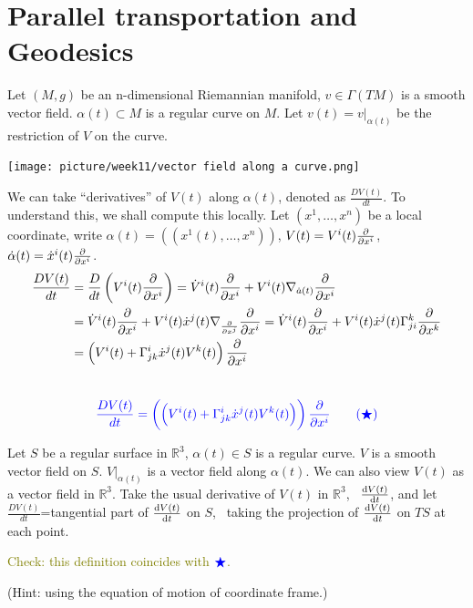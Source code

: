 \section{Parallel transportation and Geodesics}
Let \((M,g)\) be an n-dimensional Riemannian manifold, \(v\in 
\Gamma(TM)\) is a smooth vector field. \(\alpha(t)\subset M\) is a 
regular curve on \(M\). Let \(v(t)=v|_{\alpha(t)}\) be the restriction of 
\(V\) on the curve.
\begin{center}
    \texttt{[image: picture/week11/vector field 
    along a curve.png]}
\end{center}
We can take ``derivatives'' of \(V(t)\) along 
\(\alpha(t)\), denoted as \(\frac{D V(t)}{dt}\). To understand this,
we shall compute this locally. Let \((x^1,\ldots, x^n)\) be a local
coordinate, write \(\alpha(t)=\left((x^1(t),\ldots,x^n)\right)\), 
\(V(t)=V^i(t)\pdv{x^i}\), \(\dot{\alpha}(t)=\dot{x}^i(t)\pdv{x^i}\).
\begin{align*}
    \frac{DV(t)}{dt}&=\frac{D}{dt}\left(V^i(t)\pdv{x^i}\right)
    =\dot{V}^i(t)\pdv{x^i}+V^i(t)\nabla_{\dot{a}(t)}\pdv{x^i}\\
    &=\dot{V}^i(t)\pdv{x^i}+V^i(t)\dot{x}^j(t)\nabla_{\pdv{x^j}}\pdv{x^i}
    =\dot{V}^i(t)\pdv{x^i}+
    V^i(t)\dot{x}^j(t)\Gamma\indices*{_{ji}^k}\pdv{x^k}\\
    &=\left(V^i(t)+
    \Gamma\indices*{_{jk}^i}\dot{x}^j(t)V^k(t)\right)\pdv{x^i}
\end{align*}
\ie\ 
\[
    \textcolor{blue}{
        \frac{DV(t)}{dt}=\left(\left(V^i(t)+
        \Gamma\indices*{_{jk}^i}\dot{x}^j(t)V^k(t)\right)\right)
        \pdv{x^i}
        \tag{\(\textcolor{blue}{\bigstar}\)}
    }
\]
\begin{remark}
    Let \(S\) be a regular surface in \(\mathbb{R}^3\),
    \(\alpha(t)\in S\) is a regular curve. \(V\) is a smooth vector
    field on \(S\). \(V|_{\alpha(t)}\) is a vector field along
    \(\alpha(t)\). We can also view \(V(t)\) as a vector field in 
    \(\mathbb{R}^3\). Take the usual derivative of \(V(t)\) in 
    \(\mathbb{R}^3\), \ie\ \(\dv{V(t)}{t}\), and let
    \(\frac{DV(t)}{dt}\)=tangential part of \(\dv{V(t)}{t}\) on \(S\),
    \ie\ taking the projection of \(\dv{V(t)}{t}\) on \(TS\) at each point.
\end{remark}
\textcolor{olive}{
    \begin{exercise}
        Check: this definition coincides with 
        \(\textcolor{blue}{\bigstar}\).
    \end{exercise}
}
(Hint: using the equation of motion of coordinate frame.)
